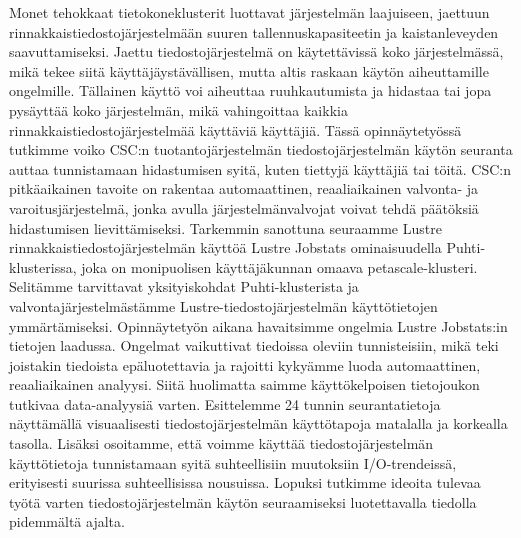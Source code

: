 \makecoverpage
\makecopyrightpage

\begin{abstractpage}[english]
\abstracttext
\end{abstractpage}



\begin{abstractpage}[finnish]
Monet tehokkaat tietokoneklusterit luottavat järjestelmän laajuiseen, jaettuun rinnakkaistiedostojärjestelmään suuren tallennuskapasiteetin ja kaistanleveyden saavuttamiseksi.
Jaettu tiedostojärjestelmä on käytettävissä koko järjestelmässä, mikä tekee siitä käyttäjäystävällisen, mutta altis raskaan käytön aiheuttamille ongelmille.
Tällainen käyttö voi aiheuttaa ruuhkautumista ja hidastaa tai jopa pysäyttää koko järjestelmän, mikä vahingoittaa kaikkia rinnakkaistiedostojärjestelmää käyttäviä käyttäjiä.
Tässä opinnäytetyössä tutkimme voiko CSC:n tuotantojärjestelmän tiedostojärjestelmän käytön seuranta auttaa tunnistamaan hidastumisen syitä, kuten tiettyjä käyttäjiä tai töitä.
CSC:n pitkäaikainen tavoite on rakentaa automaattinen, reaaliaikainen valvonta- ja varoitusjärjestelmä, jonka avulla järjestelmänvalvojat voivat tehdä päätöksiä hidastumisen lievittämiseksi.
Tarkemmin sanottuna seuraamme Lustre rinnakkaistiedostojärjestelmän käyttöä Lustre Jobstats ominaisuudella Puhti-klusterissa, joka on monipuolisen käyttäjäkunnan omaava petascale-klusteri.
Selitämme tarvittavat yksityiskohdat Puhti-klusterista ja valvontajärjestelmästämme Lustre-tiedostojärjestelmän käyttötietojen ymmärtämiseksi.
Opinnäytetyön aikana havaitsimme ongelmia Lustre Jobstats:in tietojen laadussa.
Ongelmat vaikuttivat tiedoissa oleviin tunnisteisiin, mikä teki joistakin tiedoista epäluotettavia ja rajoitti kykyämme luoda automaattinen, reaaliaikainen analyysi.
Siitä huolimatta saimme käyttökelpoisen tietojoukon tutkivaa data-analyysiä varten.
Esittelemme 24 tunnin seurantatietoja näyttämällä visuaalisesti tiedostojärjestelmän käyttötapoja matalalla ja korkealla tasolla.
Lisäksi osoitamme, että voimme käyttää tiedostojärjestelmän käyttötietoja tunnistamaan syitä suhteellisiin muutoksiin I/O-trendeissä, erityisesti suurissa suhteellisissa nousuissa.
Lopuksi tutkimme ideoita tulevaa työtä varten tiedostojärjestelmän käytön seuraamiseksi luotettavalla tiedolla pidemmältä ajalta.
\end{abstractpage}


